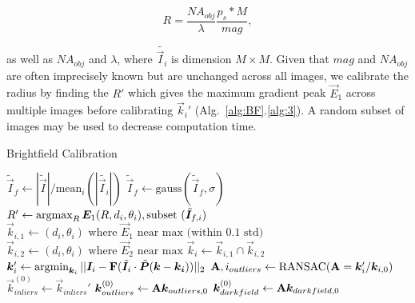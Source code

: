\begin{equation}
R = \frac{NA_{obj}}{\lambda} \frac{p_s*M}{mag},
\end{equation}

\noindent as well as $NA_{obj}$ and $\lambda$, where $\tilde{\vec{I}_i}$ is dimension $M\times M$. Given that $mag$ and $NA_{obj}$ are often imprecisely known but are unchanged across all images, we calibrate the radius by finding the $R'$ which gives the maximum gradient peak $\vec{E}_1$ across multiple images before calibrating $\vec{k}_i'$ (Alg.~\ref{alg:BF}.\ref{alg:3}). A random subset of images may be used to decrease computation time.

\begin{algorithm}
\caption{Brightfield Calibration}\label{alg:BF}
\begin{algorithmic}[1]
\State $\tilde{\vec{I}}_f \gets |\tilde{\vec{I}}|/\textrm{mean}_i(|\tilde{\vec{I}_i}|)$\label{alg:1}
\State $\tilde{\vec{I}}_f \gets \textrm{gauss}(\tilde{\vec{I}}_f,\sigma)$\label{alg:2}
\State $R' \gets \operatorname*{argmax}_R \bm{E}_1(R,d_i,\theta_i), \textrm{subset }(\tilde{\bm{I}}_{f,i})$\label{alg:3}
\State $\vec{k}_{i,1} \gets (d_i,\theta_i) \textrm{ where } \vec{E}_1 \textrm{ near max (within 0.1 std)}$\label{alg:5}
\State $\vec{k}_{i,2} \gets (d_i,\theta_i) \textrm{ where } \vec{E}_2 \textrm{ near max}$
\State $\vec{k}_{i} \gets \vec{k}_{i,1} \cap \vec{k}_{i,2}$
\State $\bm{k}_i' \gets \operatorname*{argmin}_{\bm{k}_i} ||\bm{I}_i - \mathbf{F}(\tilde{\bm{I}_i}\cdot\tilde{\bm{P}}(\bm{k}-\bm{k_i}))||_2$ 
\EndFor \label{alg:8}
\State $\mathbf{A}, i_{outliers} \gets \textrm{RANSAC}(\mathbf{A}=\bm{k}_i'/\bm{k}_{i,0})$ \label{alg:9}
\State $\vec{k}_{inliers}^{(0)} \gets \vec{k}_{inliers}'$
\State $\bm{k}_{outliers}^{(0)} \gets \mathbf{A}\bm{k}_{outliers,0}$
\State $\bm{k}_{darkfield}^{(0)} \gets \mathbf{A}\bm{k}_{darkfield,0}$ \label{alg:12}

\end{algorithmic}
\end{algorithm}

